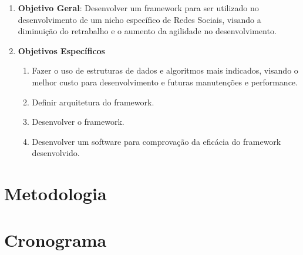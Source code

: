 \begin{enumerate}
	\item \textbf{Objetivo Geral}: Desenvolver um framework para ser utilizado no desenvolvimento de um nicho específico de Redes Sociais, visando a diminuição do retrabalho e o aumento da agilidade no desenvolvimento.

	\item \textbf{Objetivos Específicos}
	\begin{enumerate}
		\item Fazer o uso de estruturas de dados e algoritmos mais indicados, visando o melhor custo para desenvolvimento e futuras manutenções e performance.
		\item Definir arquitetura do framework.
		\item Desenvolver o framework.
		\item Desenvolver um software para comprovação da eficácia do framework desenvolvido.
	\end{enumerate}
\end{enumerate}

\section*{Metodologia}

\section*{Cronograma}

\postextual

 


